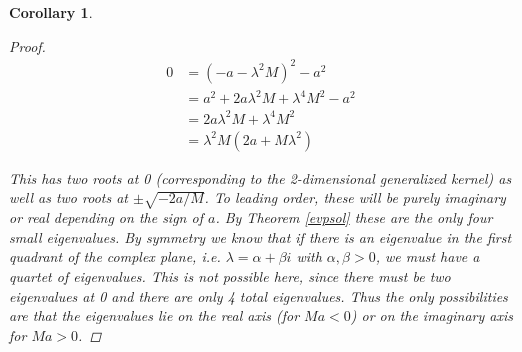 \documentclass[12pt]{article}
\newtheorem{corollary}{Corollary}
\begin{document}
\begin{corollary}
\begin{proof}
\begin{align*}
0 &= (-a - \lambda^2 M)^2 - a^2 \\
&= a^2 + 2 a \lambda^2 M + \lambda^4 M^2 - a^2 \\
&= 2 a \lambda^2 M + \lambda^4 M^2 \\
&= \lambda^2 M (2a + M \lambda^2 )
\end{align*}

This has two roots at 0 (corresponding to the 2-dimensional generalized kernel) as well as two roots at $\pm \sqrt{-2a/M}$. To leading order, these will be purely imaginary or real depending on the sign of $a$. By Theorem \ref{evpsol} these are the only four small eigenvalues. By symmetry we know that if there is an eigenvalue in the first quadrant of the complex plane, i.e. $\lambda = \alpha + \beta i$ with $\alpha, \beta > 0$, we must have a quartet of eigenvalues. This is not possible here, since there must be two eigenvalues at 0 and there are only 4 total eigenvalues. Thus the only possibilities are that the eigenvalues lie on the real axis (for $M a < 0$) or on the imaginary axis for $M a > 0$.

\end{proof}
\end{corollary}
\end{document}
